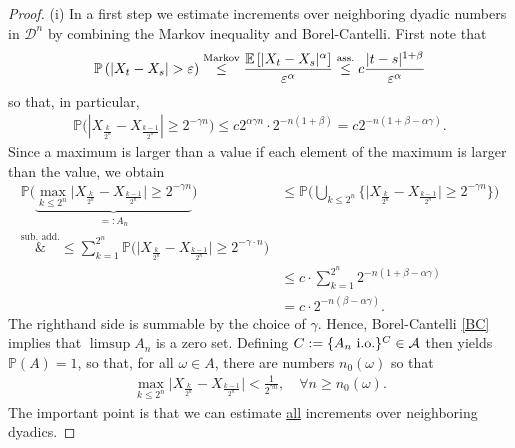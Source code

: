 \begin{proof}[Proof]
	(i) In a first step we estimate increments over neighboring dyadic numbers in $\mathcal D^n$ by combining the Markov inequality and Borel-Cantelli. First note that 
			\begin{align}\label{P}
				\mathbb{P}\left(\lvert X_t - X_s \rvert > \varepsilon \right) \overset{\text{Markov}}{\leq}  \frac{\mathbb{E}\left[ \lvert X_t - X_s \rvert^{\alpha} \right]}{\varepsilon^{\alpha}} \overset{\text{ass.}}{\leq} c  \frac{\lvert t -s \rvert^{1+\beta}}{\varepsilon^{\alpha}}
			\end{align}
			so that, in particular,
			\begin{align*}
				\mathbb{P}\big(| X_{\frac{k}{2^n}} - X_{\frac{k-1}{2^n}}| \geq 2^{-\gamma  n}\big) 
				\leq c  2^{\alpha \gamma n} \cdot 2^{-n(1+\beta)} 
				= c  2^{-n (1+\beta - \alpha \gamma)}.
			\end{align*}
			Since a maximum is larger than a value if each element of the maximum is larger than the value, we obtain
			\begin{align*}
				\mathbb{P} \big( \underbrace{\max_{k\leq 2^n} \lvert X_{\frac{k}{2^n}} - X_{\frac{k-1}{2^n}} \rvert \geq 2^{-\gamma  n}}_{=:A_n} \big) 
				&\leq \mathbb{P} \Big( \bigcup_{k\leq 2^n} \big\{ \big\lvert X_{\frac{k}{2^n}} - X_{\frac{k-1}{2^n}}\big\rvert \geq 2^{-\gamma  n}\big\}\Big) \\
				\overset{\text{sub. add.}}&{\leq} \sum_{k=1}^{2^n} \mathbb{P}\big( \lvert X_{\frac{k}{2^n}} - X_{\frac{k-1}{2^n}}\big\rvert \geq 2^{-\gamma \cdot n}\big) \\
				&\leq c \cdot \sum_{k=1}^{2^n} 2^{-n (1+\beta - \alpha \gamma)} \\
				&= c \cdot 2^{-n(\beta - \alpha  \gamma)}.
			\end{align*}
			The righthand side is summable by the choice of $\gamma$. Hence, Borel-Cantelli \ref{BC} implies that $\limsup A_n$ is a zero set. Defining $C:= \{ A_n \text{ i.o.}\}^C \in \mathcal{A}$ then yields $\mathbb{P}(A)=1$, so that, for all $\omega \in A$, there are numbers $n_0(\omega)$ so that
			\begin{align}\label{kolmogorov_tight_eq1}
				\max_{k\leq 2^n} \big\lvert X_{\frac{k}{2^n}} - X_{\frac{k-1}{2^n}}\big\rvert < \frac{1}{2^{\gamma  n}}, \quad \forall n \geq n_0(\omega).
			\end{align}
			The important point is that we can estimate \underline{all} increments over neighboring dyadics.\smallskip
		

\end{proof}
